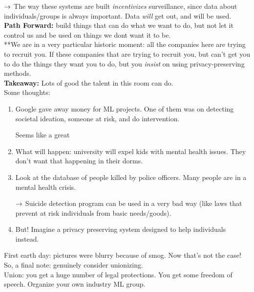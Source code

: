 $\rightarrow$ The way these systems are built {\it incentivizes} surveillance, since data about individuals/groups is always important. Data {\it will} get out, and will be used. \\

{\bf Path Forward:} build things that can do what we want to do, but not let it control us and be used on things we dont want it to be. \\

**We are in a very particular historic moment: all the companies here are trying to recruit you. If these companies that are trying to recruit you, but can't get you to do the things they want you to do, but you {\it insist} on using privacy-preserving methods. \\

{\bf Takeaway:} Lots of good the talent in this room can do. \\

Some thoughts:
\begin{enumerate}
    \item Google gave away money for ML projects. One of them was on detecting societal ideation, someone at risk, and do intervention.
    
    Seems like a great 
    
    \item What will happen: university will expel kids with mental health issues. They don't want that happening in their dorms.
    
    \item Look at the database of people killed by police officers. Many people are in a mental health crisis.
    
    $\rightarrow$ Suicide detection program can be used in a very bad way (like laws that prevent at risk individuals from basic needs/goods).
    
    \item But! Imagine a privacy preserving system designed to help individuals instead.

\end{enumerate}

First earth day: pictures were blurry because of smog. Now that's not the case! So, a final note: genuinely consider unionizing. \\

Union: you get a huge number of legal protections. You get some freedom of speech. Organize your own industry ML group. \\


